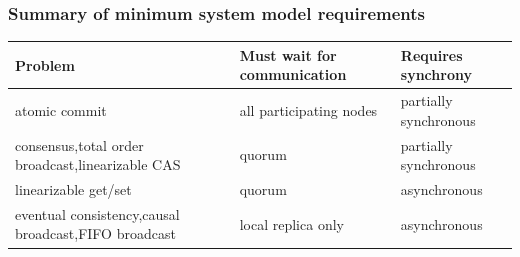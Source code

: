 \begin{frame}
    \label{s:model-requirements}
    \frametitle{Summary of minimum system model requirements}
    \renewcommand{\arraystretch}{1.5}%
    \begin{tabular}{>{\raggedright}p{3.7cm}|>{\raggedright}p{3cm}|>{\raggedright\arraybackslash}p{2.4cm}} %
        \textbf{Problem} & \textbf{Must wait for communication} & \textbf{Requires synchrony} \\\hline
        atomic commit & all participating nodes & partially synchronous\pause\\
        consensus,\newline total order broadcast,\newline linearizable CAS & quorum & partially synchronous\pause\\
        linearizable get/set & quorum & asynchronous\pause\\
        eventual consistency,\newline causal broadcast,\newline FIFO broadcast & local replica only & asynchronous \\\hline
    \end{tabular}
\end{frame}
\label{l:model-requirements}



